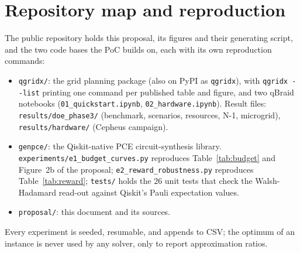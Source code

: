 \documentclass[10pt,a4paper]{article}
\begin{document}
\section{Repository map and reproduction}

The public repository holds this proposal, its figures and their generating
script, and the two code bases the PoC builds on, each with its own
reproduction commands:
\begin{itemize}
\item \texttt{qgridx/}: the grid planning package (also on PyPI as
\texttt{qgridx}), with \texttt{qgridx -{}-list} printing one command per
published table and figure, and two qBraid notebooks
(\texttt{01\_quickstart.ipynb}, \texttt{02\_hardware.ipynb}). Result files:
\texttt{results/doe\_phase3/} (benchmark, scenarios, resources, N-1,
microgrid), \texttt{results/hardware/} (Cepheus campaign).
\item \texttt{genpce/}: the Qiskit-native PCE circuit-synthesis library.
\texttt{experiments/e1\_budget\_curves.py} reproduces Table~\ref{tab:budget}
and Figure~2b of the proposal; \texttt{e2\_reward\_robustness.py} reproduces
Table~\ref{tab:reward}; \texttt{tests/} holds the 26 unit tests that check the
Walsh-Hadamard read-out against Qiskit's Pauli expectation values.
\item \texttt{proposal/}: this document and its sources.
\end{itemize}
Every experiment is seeded, resumable, and appends to CSV; the optimum of an
instance is never used by any solver, only to report approximation ratios.
\end{document}
